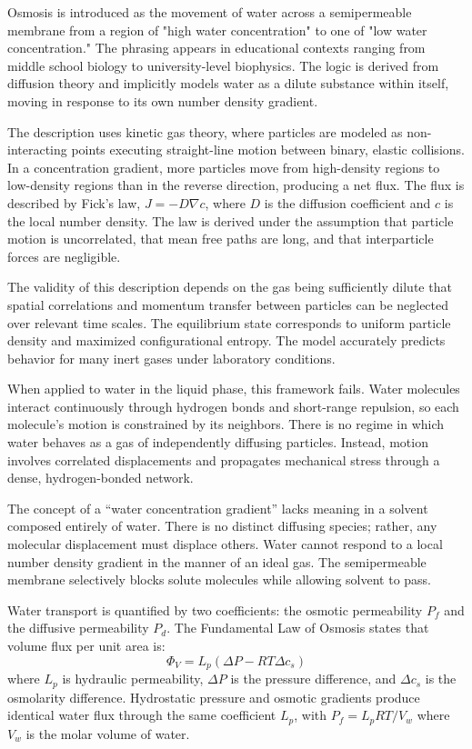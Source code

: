 Osmosis is introduced as the movement of water across a semipermeable membrane from a region of "high water concentration" to one of "low water concentration." The phrasing appears in educational contexts ranging from middle school biology to university-level biophysics. The logic is derived from diffusion theory and implicitly models water as a dilute substance within itself, moving in response to its own number density gradient.

The description uses kinetic gas theory, where particles are modeled as non-interacting points executing straight-line motion between binary, elastic collisions. In a concentration gradient, more particles move from high-density regions to low-density regions than in the reverse direction, producing a net flux. The flux is described by Fick's law, $J = -D \nabla c$, where $D$ is the diffusion coefficient and $c$ is the local number density. The law is derived under the assumption that particle motion is uncorrelated, that mean free paths are long, and that interparticle forces are negligible.

The validity of this description depends on the gas being sufficiently dilute that spatial correlations and momentum transfer between particles can be neglected over relevant time scales. The equilibrium state corresponds to uniform particle density and maximized configurational entropy. The model accurately predicts behavior for many inert gases under laboratory conditions.

When applied to water in the liquid phase, this framework fails. Water molecules interact continuously through hydrogen bonds and short-range repulsion, so each molecule's motion is constrained by its neighbors. There is no regime in which water behaves as a gas of independently diffusing particles. Instead, motion involves correlated displacements and propagates mechanical stress through a dense, hydrogen-bonded network.

The concept of a “water concentration gradient” lacks meaning in a solvent composed entirely of water. There is no distinct diffusing species; rather, any molecular displacement must displace others. Water cannot respond to a local number density gradient in the manner of an ideal gas. The semipermeable membrane selectively blocks solute molecules while allowing solvent to pass.

Water transport is quantified by two coefficients: the osmotic permeability $P_f$ and the diffusive permeability $P_d$. The Fundamental Law of Osmosis states that volume flux per unit area is:
\[
\Phi_V = L_p(\Delta P - RT\Delta c_s)
\]
where $L_p$ is hydraulic permeability, $\Delta P$ is the pressure difference, and $\Delta c_s$ is the osmolarity difference. Hydrostatic pressure and osmotic gradients produce identical water flux through the same coefficient $L_p$, with $P_f = L_p RT/V_w$ where $V_w$ is the molar volume of water.

